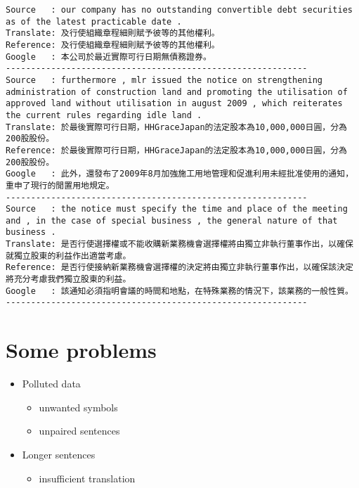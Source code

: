 \documentclass[11pt]{article}
\providecommand{\tightlist}{%
      \setlength{\itemsep}{0pt}\setlength{\parskip}{0pt}}
\begin{document}
    \begin{Verbatim}[commandchars=\\\{\}]
Source   : our company has no outstanding convertible debt securities as of the latest practicable date .
Translate: 及行使組織章程細則賦予彼等的其他權利。
Reference: 及行使組織章程細則賦予彼等的其他權利。
Google   : 本公司於最近實際可行日期無債務證券。
------------------------------------------------------------
Source   : furthermore , mlr issued the notice on strengthening administration of construction land and promoting the utilisation of approved land without utilisation in august 2009 , which reiterates the current rules regarding idle land .
Translate: 於最後實際可行日期，HHGraceJapan的法定股本為10,000,000日圓，分為200股股份。
Reference: 於最後實際可行日期，HHGraceJapan的法定股本為10,000,000日圓，分為200股股份。
Google   : 此外，還發布了2009年8月加強施工用地管理和促進利用未經批准使用的通知，重申了現行的閒置用地規定。
------------------------------------------------------------
Source   : the notice must specify the time and place of the meeting and , in the case of special business , the general nature of that business .
Translate: 是否行使選擇權或不能收購新業務機會選擇權將由獨立非執行董事作出，以確保就獨立股東的利益作出適當考慮。
Reference: 是否行使接納新業務機會選擇權的決定將由獨立非執行董事作出，以確保該決定將充分考慮我們獨立股東的利益。
Google   : 該通知必須指明會議的時間和地點，在特殊業務的情況下，該業務的一般性質。
------------------------------------------------------------

    \end{Verbatim}

    \section{Some problems}\label{some-problems}

\begin{itemize}
\tightlist
\item
   Polluted data

  \begin{itemize}
  \tightlist
  \item
    unwanted symbols
  \item
    unpaired sentences
  \end{itemize}
\item
   Longer sentences

  \begin{itemize}
  \tightlist
  \item
    insufficient translation
  \end{itemize}
\end{itemize}
\end{document}
